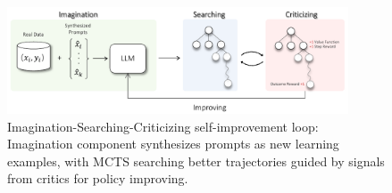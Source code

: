 \begin{figure}[!t]
    \centering
    \includegraphics[width=0.9\textwidth]{figures/framework_crop.pdf}
    \caption{Imagination-Searching-Criticizing self-improvement loop: Imagination component synthesizes prompts as new learning examples, with MCTS searching better trajectories guided by signals from critics for policy improving.}
    \label{fig:framework}
\end{figure}
